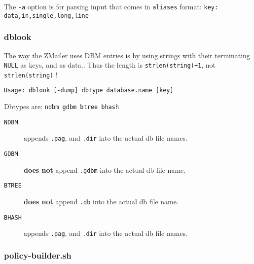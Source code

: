 The {\tt -a} option is for parsing input that comes in 
{\tt aliases} format: {\tt key: data,in,single,long,line}




\subsubsection{dblook}



The way the ZMailer uses DBM entries is by using strings with 
their terminating {\tt NULL} as keys, and as data.. Thus the 
length is {\tt strlen(string)+1}, not {\tt strlen(string)} !

\begin{tscreen}
\begin{verbatim}
Usage: dblook [-dump] dbtype database.name [key]
\end{verbatim}
\end{tscreen}


Dbtypes are: {\tt ndbm gdbm btree bhash}

\begin{description}
\item[{\tt NDBM}] \mbox{}

appends {\tt .pag}, and {\tt .dir} 
into the actual db file names.

\item[{\tt GDBM}] \mbox{}

{\bf does not} append {\tt .gdbm} 
into the actual db file name.

\item[{\tt BTREE}] \mbox{}

{\bf does not} append {\tt .db} 
into the actual db file name.

\item[{\tt BHASH}] \mbox{}

appends {\tt .pag}, and {\tt .dir} 
into the actual db file names.

\end{description}





\subsubsection{policy-builder.sh}



